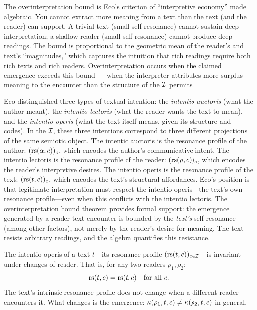 \begin{interpretation}
The overinterpretation bound is Eco's criterion of ``interpretive
economy'' made algebraic. You cannot extract more meaning from a text
than the text (and the reader) can support. A trivial text (small
self-resonance) cannot sustain deep interpretation; a shallow reader
(small self-resonance) cannot produce deep readings. The bound is
proportional to the geometric mean of the reader's and text's
``magnitudes,'' which captures the intuition that rich readings require
both rich texts and rich readers. Overinterpretation occurs when the
claimed emergence exceeds this bound --- when the interpreter attributes
more surplus meaning to the encounter than the structure of the $\mathcal{I}$
permits.
\end{interpretation}

\begin{remark}
Eco distinguished three types of textual intention: the \emph{intentio auctoris} (what the author meant), the \emph{intentio lectoris} (what the reader wants the text to mean), and the \emph{intentio operis} (what the text itself means, given its structure and codes). In the $\mathcal{I}$, these three intentions correspond to three different projections of the same semiotic object. The intentio auctoris is the resonance profile of the author: $(\mathrm{rs}(\alpha, c))_c$, which encodes the author's communicative intent. The intentio lectoris is the resonance profile of the reader: $(\mathrm{rs}(\rho, c))_c$, which encodes the reader's interpretive desires. The intentio operis is the resonance profile of the text: $(\mathrm{rs}(t, c))_c$, which encodes the text's structural affordances. Eco's position is that legitimate interpretation must respect the intentio operis---the text's own resonance profile---even when this conflicts with the intentio lectoris. The overinterpretation bound theorem provides formal support: the emergence generated by a reader-text encounter is bounded by the \emph{text's} self-resonance (among other factors), not merely by the reader's desire for meaning. The text resists arbitrary readings, and the algebra quantifies this resistance.
\end{remark}

\begin{theorem}
\label{thm:intentio-operis}
The intentio operis of a text $t$---its resonance profile $(\mathrm{rs}(t, c))_{c \in \mathcal{I}}$---is invariant under changes of reader. That is, for any two readers $\rho_1, \rho_2$:
\[
  \mathrm{rs}(t, c) = \mathrm{rs}(t, c) \quad \text{for all } c.
\]
The text's intrinsic resonance profile does not change when a different reader encounters it. What changes is the emergence: $\kappa(\rho_1, t, c) \neq \kappa(\rho_2, t, c)$ in general.
\end{theorem}

